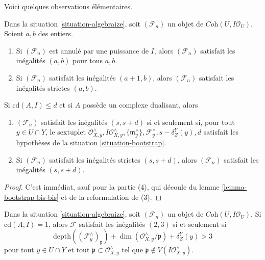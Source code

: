 \noindent
Voici quelques observations élémentaires.

\begin{lemma}
\label{lemma-elementary}
Dans la situation \ref{situation-algebraize}, soit $(\mathcal{F}_n)$ un objet
de $\textit{Coh}(U, I\mathcal{O}_U)$. Soient $a, b$ des entiers.
\begin{enumerate}
\item Si $(\mathcal{F}_n)$ est annulé par une puissance de $I$, alors
$(\mathcal{F}_n)$ satisfait les inégalités $(a, b)$ pour tous $a, b$.
\item Si $(\mathcal{F}_n)$ satisfait les inégalités $(a + 1, b)$, alors
$(\mathcal{F}_n)$ satisfait les inégalités strictes $(a, b)$.
\end{enumerate}
Si $\text{cd}(A, I) \leq d$ et si $A$ possède un complexe dualisant, alors
\begin{enumerate}
\item[(3)] $(\mathcal{F}_n)$ satisfait les inégalités $(s, s + d)$
si et seulement si, pour tout $y \in U \cap Y$, le sextuplet
$\mathcal{O}_{X, y}^\wedge, I\mathcal{O}_{X, y}^\wedge,
\{\mathfrak m_y^\wedge\}, \mathcal{F}_y^\wedge, s - \delta^Y_Z(y), d$
satisfait les hypothèses de la situation \ref{situation-bootstrap}.
\item[(4)]
Si $(\mathcal{F}_n)$ satisfait les inégalités strictes $(s, s + d)$, alors
$(\mathcal{F}_n)$ satisfait les inégalités $(s, s + d)$.
\end{enumerate}
\end{lemma}

\begin{proof}
C'est immédiat, sauf pour la partie (4), qui découle du
lemme \ref{lemma-bootstrap-bis-bis} et de la reformulation de (3).
\end{proof}

\begin{lemma}
\label{lemma-explain-2-3-cd-1}
Dans la situation \ref{situation-algebraize}, soit $(\mathcal{F}_n)$ un objet
de $\textit{Coh}(U, I\mathcal{O}_U)$. Si $\text{cd}(A, I) = 1$, alors
$\mathcal{F}$ satisfait les inégalités $(2, 3)$ si et seulement si
$$
\text{depth}((\mathcal{F}^\wedge_y)_\mathfrak p) +
\dim(\mathcal{O}_{X, y}^\wedge/\mathfrak p) + \delta^Y_Z(y) > 3
$$
pour tout $y \in U \cap Y$ et tout $\mathfrak p \subset \mathcal{O}_{X, y}^\wedge$
tel que $\mathfrak p \not \in V(I\mathcal{O}_{X, y}^\wedge)$.
\end{lemma}

